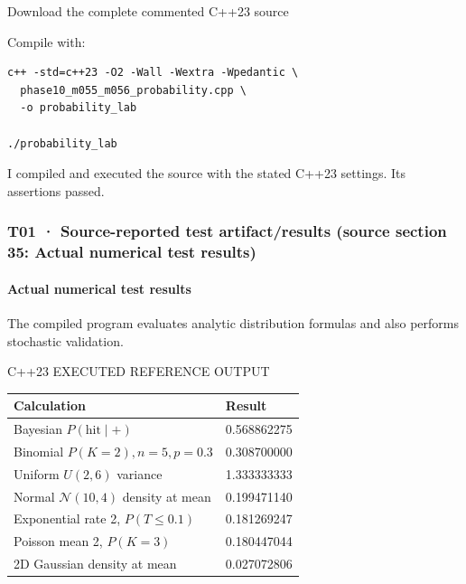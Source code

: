 Download the complete commented C++23 source

Compile with:

\begin{verbatim}
c++ -std=c++23 -O2 -Wall -Wextra -Wpedantic \
  phase10_m055_m056_probability.cpp \
  -o probability_lab

./probability_lab
\end{verbatim}

I compiled and executed the source with the stated C++23 settings. Its assertions passed.

\subsubsection{T01 · Source-reported test artifact/results (source section 35: Actual numerical test results)}\label{02-foundations-ii-ch039-t01-source-reported-test-artifactresults-source-section-35-actual-numerical-test-results}

\hypertarget{02-foundations-ii-ch039-t01-source-reported-test-artifactresults-source-section-35-actual-numerical-test-results}{}

\paragraph{Actual numerical test results}\label{02-foundations-ii-ch039-actual-numerical-test-results}

\hypertarget{02-foundations-ii-ch039-actual-numerical-test-results}{}

The compiled program evaluates analytic distribution formulas and also performs stochastic validation.

C++23 EXECUTED REFERENCE OUTPUT

{\def\LTcaptype{none} %
\begin{longtable}[]{@{}ll@{}}
\toprule\noalign{}
Calculation & Result \\
\midrule\noalign{}
\endhead
\bottomrule\noalign{}
\endlastfoot
Bayesian \(P(\text{hit}\mid+)\) & 0.568862275 \\
Binomial \(P(K=2), n=5,p=0.3\) & 0.308700000 \\
Uniform \(U(2,6)\) variance & 1.333333333 \\
Normal \(\mathcal N(10,4)\) density at mean & 0.199471140 \\
Exponential rate 2, \(P(T\le0.1)\) & 0.181269247 \\
Poisson mean 2, \(P(K=3)\) & 0.180447044 \\
2D Gaussian density at mean & 0.027072806 \\
\end{longtable}
}

